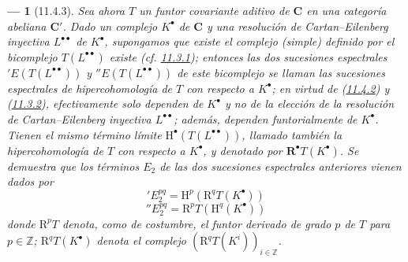 \documentclass[10pt,oneside,openany]{book}
\theoremstyle{egaenv}\newtheorem*{env}{---}
\theoremstyle{egastatement}
\theoremstyle{egadescription}
\newcommand{\oldpage}[2][]{\marginnote{\normalfont\scriptsize\textbf{#1}\,|\,#2}\ignorespaces}
\begin{document}
\begin{env}[11.4.3]
\label{0.11.4.3}
\label{0.11.4.3-fr}
Sea ahora $T$ un \emph{funtor covariante aditivo} de $\boldsymbol{C}$ en una categoría abeliana $\boldsymbol{C}'$.
Dado un complejo $K^\bullet$ de $\boldsymbol{C}$ y una resolución de Cartan--Eilenberg \emph{inyectiva} $L^{\bullet\bullet}$ de $K^\bullet$, supongamos que existe el complejo (simple) definido por el bicomplejo $T(L^{\bullet\bullet})$ existe
(cf. \hyperref[0.11.3.1-fr]{11.3.1}); entonces las dos sucesiones espectrales
$'E(T(L^{\bullet\bullet}))$ y $''E(T(L^{\bullet\bullet}))$ de este bicomplejo se llaman las \emph{sucesiones espectrales de hipercohomología} de $T$ con respecto a $K^\bullet$; en virtud de (\hyperref[0.11.4.2-fr]{11.4.2}) y (\hyperref[0.11.3.2-fr]{11.3.2}), efectivamente solo dependen de $K^\bullet$ y no de la elección de la resolución de Cartan--Eilenberg inyectiva $L^{\bullet\bullet}$;
además, dependen \emph{funtorialmente} de $K^\bullet$.
Tienen el mismo término límite $\mathrm H^\bullet(T(L^{\bullet\bullet}))$, llamado también la \emph{hipercohomología} de $T$ con respecto a $K^\bullet$, y denotado por $\mathbf R^\bullet T(K^\bullet)$.
Se demuestra que los términos $E_2$ de las dos sucesiones espectrales anteriores vienen dados por
\[
  \label{0.11.4.3.1-fr}
  'E_2^{pq}=\mathrm H^p(\mathrm R^qT(K^\bullet))
  \tag{11.4.3.1}
\]
\[
  \label{0.11.4.3.2-fr}
  ''E_2^{pq}=\mathrm R^pT(\mathrm H^q(K^\bullet))
  \tag{11.4.3.2}
\]
\oldpage[0\textsubscript{III}]{34}
donde $\mathrm R^pT$ denota, como de costumbre, el \emph{funtor derivado} de grado $p$ de $T$ para $p\in\mathbb Z$;
$\mathrm R^qT(K^\bullet)$ denota el complejo $(\mathrm R^qT(K^i))_{i\in\mathbb Z}$.
\end{env}
\end{document}

